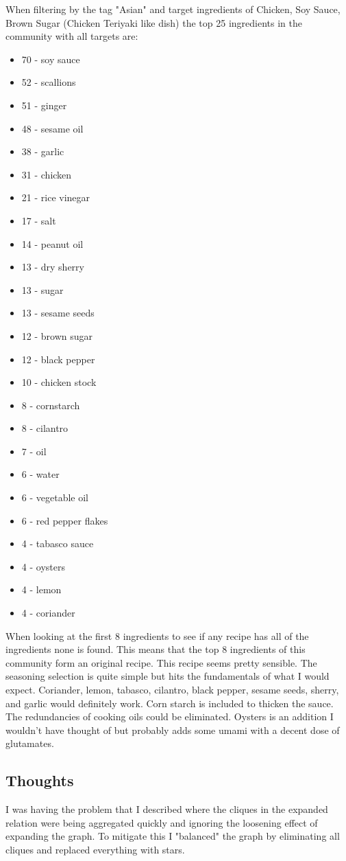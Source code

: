\documentclass[conference]{IEEEtran}
\begin{document}
When filtering by the tag "Asian" and target ingredients of Chicken, Soy Sauce, Brown Sugar
(Chicken Teriyaki like dish) the top 25 ingredients in the community with all targets are:
\begin{itemize}
\item 70 - soy sauce
\item 52 - scallions
\item 51 - ginger
\item 48 - sesame oil
\item 38 - garlic
\item 31 - chicken
\item 21 - rice vinegar
\item 17 - salt
\item 14 - peanut oil
\item 13 - dry sherry
\item 13 - sugar
\item 13 - sesame seeds
\item 12 - brown sugar
\item 12 - black pepper
\item 10 - chicken stock
\item 8 - cornstarch
\item 8 - cilantro
\item 7 - oil
\item 6 - water
\item 6 - vegetable oil
\item 6 - red pepper flakes
\item 4 - tabasco sauce
\item 4 - oysters
\item 4 - lemon
\item 4 - coriander
\end{itemize}

When looking at the first 8 ingredients to see if any recipe has all of the ingredients none
is found. This means that the top 8 ingredients of this community form an original recipe.
This recipe seems pretty sensible. The seasoning selection is quite simple but hits the
fundamentals of what I would expect. Coriander, lemon, tabasco, cilantro, black pepper, sesame
seeds, sherry, and garlic would definitely work. Corn starch is included to thicken the sauce.
The redundancies of cooking oils could be eliminated. Oysters is an addition I wouldn't have
thought of but probably adds some umami with a decent dose of glutamates.

\subsection{Thoughts}
I was having the problem that I described where the cliques in the expanded relation were
being aggregated quickly and ignoring the loosening effect of expanding the graph. To mitigate
this I "balanced" the graph by eliminating all cliques and replaced everything with stars.
\end{document}
